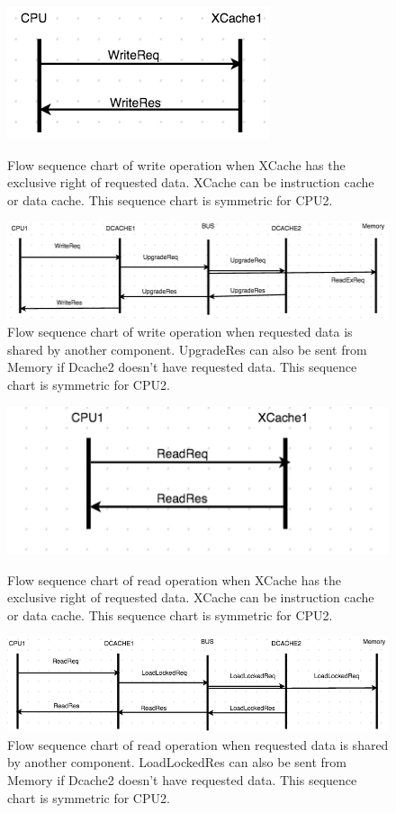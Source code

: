 \documentclass[12pt,frontmatter,copyright,thesis]{usfmanus}
\begin{document}
\begin{appendix}
\begin{figure}[h]
 \centering
 \includegraphics[width=1.8In]{figures/write1.png}
 \caption{\footnotesize Flow sequence chart of write operation when XCache has the exclusive right of requested data. XCache can be instruction cache or data cache. This sequence chart is symmetric for CPU2. }
 \label{write1}
   \centering
 \includegraphics[width=4In]{figures/write2.png}
 \caption{\footnotesize Flow sequence chart of write operation when requested data is shared by another component. UpgradeRes can also be sent from Memory if Dcache2 doesn't have requested data. This sequence chart is symmetric for CPU2. }
 \label{write2}
 \end{figure}
\begin{figure}[h] 
 \centering
 \includegraphics[width=2In]{figures/read1.png}
 \caption{\footnotesize Flow sequence chart of read operation when XCache has the exclusive right of requested data. XCache can be instruction cache or data cache. This sequence chart is symmetric for CPU2. }
 \label{read1}
 
 \centerline{
 \includegraphics[width=4In]{figures/read3.png}}
 \caption{\footnotesize Flow sequence chart of read operation when requested data is shared by another component. LoadLockedRes can also be sent from Memory if Dcache2 doesn't have requested data. This sequence chart is symmetric for CPU2. }
 \label{read3}


\end{figure}
\end{appendix}
\end{document}
